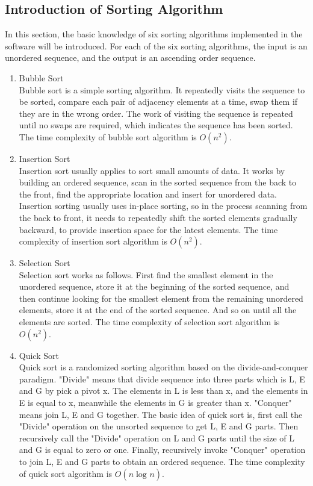 \documentclass[paper=a4, fontsize=11pt,twoside]{scrartcl}		%
\begin{document}
\subsection{Introduction of Sorting Algorithm}

In this section, the basic knowledge of six sorting algorithms implemented in the software will be introduced. For each of the six sorting algorithms, the input is an unordered sequence, and the output is an ascending order sequence.\\
\begin{enumerate}
\item Bubble Sort\\
Bubble sort is a simple sorting algorithm. It repeatedly visits the sequence to be sorted, compare each pair of adjacency elements at a time, swap them if they are in the wrong order. The work of visiting the sequence is repeated until no swaps are required, which indicates the sequence has been sorted. The time complexity of bubble sort algorithm is $O(n^{2})$.

\item Insertion Sort\\
Insertion sort usually applies to sort small amounts of data. It works by building an ordered sequence, scan in the sorted sequence from the back to the front, find the appropriate location and insert for unordered data. Insertion sorting usually uses in-place sorting, so in the process scanning from the back to front, it needs to repeatedly shift the sorted elements gradually backward, to provide insertion space for the latest elements. The time complexity of insertion sort algorithm is $O(n^{2})$.

\item Selection Sort\\
Selection sort works as follows. First find the smallest element in the unordered sequence, store it at the beginning of the sorted sequence, and then continue looking for the smallest element from the remaining unordered elements, store it at the end of the sorted sequence. And so on until all the elements are sorted. The time complexity of selection sort algorithm is $O(n^{2})$.

\item Quick Sort\\
Quick sort is a randomized sorting algorithm based on the divide-and-conquer paradigm.
"Divide" means that divide sequence into three parts which is L, E and G by pick a pivot x. The elements in L is less than x, and the elements in E is equal to x, meanwhile the elements in G is greater than x. "Conquer" means join L, E and G together. The basic idea of quick sort is, first call the "Divide" operation on the unsorted sequence to get L, E and G parts. Then recursively call the "Divide" operation on L and G parts until the size of L and G is equal to zero or one. Finally, recursively invoke "Conquer" operation to join L, E and G parts to obtain an ordered sequence. The time complexity of quick sort algorithm is $O(n\log_{}n)$.


\end{enumerate}
\end{document}
